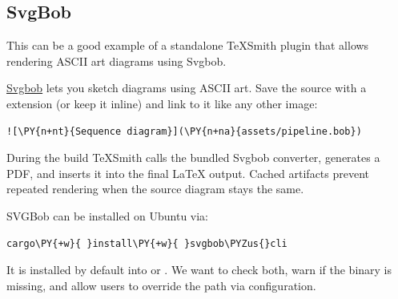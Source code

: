 \documentclass[a4paper,twoside]{article}
\begin{document}
\subsection{SvgBob}
This can be a good example of a standalone TeXSmith plugin that allows rendering ASCII art diagrams using Svgbob.

\href{https://github.com/ivanceras/svgbob}{Svgbob} lets you sketch diagrams using ASCII art. Save the source with a  extension (or keep it inline) and link to it like any other image:
\begin{tscode}[lang=markdown, engine=pygments]
\begin{Verbatim}[commandchars=\\\{\},breaklines, breakanywhere, commandchars=\\\{\}]
![\PY{n+nt}{Sequence diagram}](\PY{n+na}{assets/pipeline.bob})
\end{Verbatim}
\end{tscode}
During the build TeXSmith calls the bundled Svgbob converter, generates a PDF, and inserts it into the final \LaTeX{} output. Cached artifacts prevent repeated rendering when the source diagram stays the same.

SVGBob can be installed on Ubuntu via:
\begin{tscode}[lang=bash, engine=pygments]
\begin{Verbatim}[commandchars=\\\{\},breaklines, breakanywhere, commandchars=\\\{\}]
cargo\PY{+w}{ }install\PY{+w}{ }svgbob\PYZus{}cli
\end{Verbatim}
\end{tscode}
It is installed by default into  or . We want to check both, warn if the binary is missing, and allow users to override the path via configuration.
\end{document}
